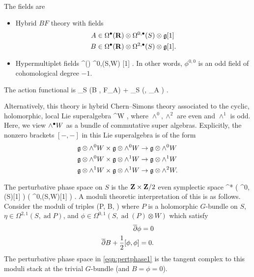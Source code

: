 \documentclass[11pt]{amsart}
\renewcommand{\op}{\operatorname}
\begin{document}
The fields are
\begin{itemize}
\item Hybrid $BF$ theory with fields
\begin{align*}
A & \in \Omega^{\bullet}(\mathbf{R}) \otimes \Omega^{0,\bullet}(S) \otimes \mathfrak{g} [1] \\
B & \in \Omega^{\bullet}(\mathbf{R}) \otimes \Omega^{2,\bullet}(S)\otimes \mathfrak{g} [1] .
\end{align*}
\item Hypermultiplet fields
\beqn
\phi \in \Omega^\bu(\R) \otimes \Omega^{0,\bu}(S,\Pi W) \otimes {} [1] .
\eeqn
In other words, $\phi^{0,0}$ is an odd field of cohomological degree $-1$.
\end{itemize}
The action functional is
\beqn
\int_{\R \times S} (B , F_A) +  \int_{\R \times S} (\phi, \dbar_A \phi) .
\eeqn

Alternatively, this theory is hybrid Chern--Simons theory associated to the cyclic, holomorphic, local Lie superalgebra
\beqn
{} \otimes \wedge^\bu W ,
\eeqn
where $\wedge^0, \wedge^2$ are even and $\wedge^1$ is odd.
Here, we view $\wedge^\bullet W$ as a bundle of commutative super algebras.
Explicitly, the nonzero brackets $[-,-]$ in this Lie superalgebra is of the form
\begin{align*}
\mathfrak{g} \otimes \wedge^0 W \times \mathfrak{g} \otimes \wedge^0 W & \to \mathfrak{g} \otimes \wedge^0 W  \\
\mathfrak{g} \otimes \wedge^0 W \times \mathfrak{g} \otimes \wedge^1 W & \to \mathfrak{g} \otimes \wedge^1 W \\
\mathfrak{g} \otimes \wedge^1 W \times \mathfrak{g} \otimes \wedge^1 W & \to \mathfrak{g} \otimes \wedge^2 W .
\end{align*}

The perturbative phase space on $S$ is the $\mathbf{Z} \times \mathbf{Z}/2$ even symplectic space
\beqn
\T^* \left(  \otimes \Omega^{0,\bu}(S)[1] \right) \oplus \Pi \left( \otimes \Omega^{0,\bu}(S,W)[1] \right) .
\eeqn
A moduli theoretic interpretation of this is as follows.
Consider the moduli of triples
\beqn\label{eqn:pertphase1}
(P, B, \phi)
\eeqn
where $P$ is a holomorphic $G$-bundle on $S$, $\eta \in \Omega^{2,1}(S, \op{ad} P)$, and $\phi \in \Omega^{0,1}(S,\op{ad}(P) \otimes W)$ which satisfy 
\begin{align*}
\overline{\partial} \phi = 0 \\
\overline{\partial} B + \frac12 [\phi,\phi] = 0 .
\end{align*}
The perturbative phase space in \eqref{eqn:pertphase1} is the tangent complex to this moduli stack at the trivial $G$-bundle (and $B = \phi = 0$).
\end{document}
